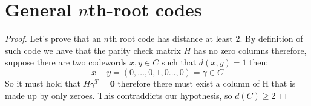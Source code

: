 \documentclass[11pt,a4paper]{report}
\theoremstyle{plain}
\theoremstyle{definition}
\begin{document}
\chapter{General $n$th-root codes}

\begin{rem-hand}[7.1.2]
\end{rem-hand}
\begin{proof}
	Let's prove that an $n$th root code has distance at least $2$. By definition of such code we have that the parity check matrix $H$ has no zero columns therefore, suppose there are two codewords $x,y \in C$ such that $d(x,y) = 1$ then:
	\[
		x-y = (0,\ldots,0,1,0\ldots,0) = \gamma \in C	
	\]
	So it must hold that $H\gamma^T = \textbf{0}$ therefore there must exist a column of  H that is made up by only zeroes. This contraddicts our hypothesis, so $d(C) \ge 2$
\end{proof}
\end{document}
